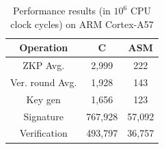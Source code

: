 \documentclass[runningheads,a4paper]{llncs}
\begin{document}
\begin{table}[ht]
\centering
\begin{tabular}{c | c | c}
Operation		&	C		& 	ASM	\\ \hline
ZKP Avg.		&	2,999		&	222 	\\
Ver. round Avg. &	1,928		&	143	\\ \hline
Key gen		&	1,656		&	123	\\
Signature		&	767,928	&	57,092	\\
Verification	&	493,797	&	36,757
\end{tabular}
\caption{Performance results (in $10^6$ CPU clock cycles) on ARM Cortex-A57}
\end{table}







\end{document}
